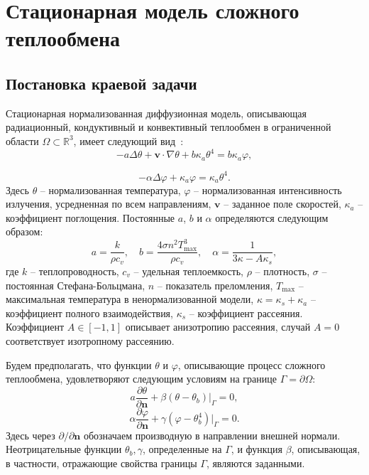 \section{Стационарная модель сложного теплообмена}\label{sec:ch1/sec3}

\subsection{Постановка краевой задачи}
\label{subsec:ch1/sec3/state}

Стационарная нормализованная диффузионная модель, описывающая
радиационный, кондуктивный и конвективный теплообмен в
ограниченной области $\Omega \subset \mathbb{R}^3$,
имеет следующий вид~\cite{modest2013radiative}:
\begin{equation}
    \label{eq:1_4:4-1}
    -a \Delta \theta + \textbf{v} \cdot \nabla \theta
    + b \kappa_a \theta^4 =  b \kappa_a \varphi,
\end{equation}

\begin{equation}
    \label{eq:1_4:4-2}
    - \alpha \Delta \varphi + \kappa_a \varphi = \kappa_a \theta^4.
\end{equation}
Здесь $\theta$ -- нормализованная температура, $\varphi$ --
нормализованная интенсивность излучения, усредненная по всем
направлениям, $\textbf{v}$ -- заданное поле скоростей, $\kappa_a$ --
коэффициент поглощения.
Постоянные $a$, $b$ и $\alpha$
определяются следующим образом:
\[
    a=\frac{k}{\rho c_v},\quad b = \frac{4\sigma n^2 T_{\max}^3}{\rho c_v},
    \quad \alpha=\frac{1}{3\kappa - A \kappa_s},
\]
где $k$ -- теплопроводность, $c_v$ -- удельная теплоемкость, $\rho$ --
плотность, $\sigma$ -- постоянная Стефана-Больцмана, $n$ --
показатель преломления, $T_{\max}$ -- максимальная температура в
ненормализованной модели, $\kappa = \kappa_s + \kappa_a$ -- коэффициент
полного взаимодействия, $\kappa_s$ -- коэффициент рассеяния.
Коэффициент $A \in [-1, 1]$ описывает анизотропию рассеяния, случай
$A=0$ соответствует изотропному рассеянию.

Будем предполагать, что функции $\theta$ и $\varphi$, описывающие
процесс сложного теплообмена, удовлетворяют следующим условиям на
границе $\Gamma = \partial \Omega$:
\begin{equation}
    \label{eq:1_4:4-3}
    a \frac{\partial \theta}{\partial \mathbf{n}}
    +\left.\beta\left(\theta-\theta_{b}\right)\right|_{\Gamma}=0,
\end{equation}
\begin{equation}
    \label{eq:1_4:4-4}
    \alpha \frac{\partial \varphi}{\partial \mathbf{n}} + \gamma
    (\varphi-\theta_b^4)|_{\Gamma} = 0.
\end{equation}
Здесь через $\partial/\partial \mathbf{n}$ обозначаем производную
в направлении внешней нормали.
Неотрицательные функции $\theta_{b}, \gamma$, определенные на $\Gamma$, и функция $\beta$,
описывающая, в частности, отражающие свойства границы $\Gamma$, являются заданными.

